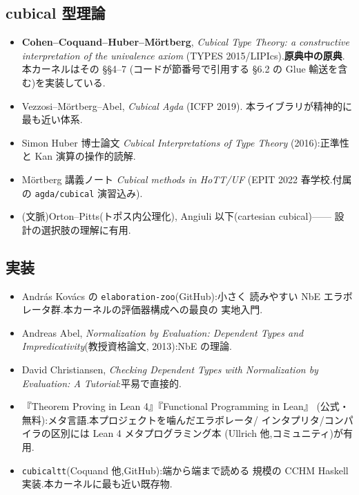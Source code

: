 \documentclass[11pt]{ltjsarticle}
\begin{document}
\subsection{cubical 型理論}
\begin{itemize}[leftmargin=1.5em]
\item \textbf{Cohen--Coquand--Huber--M\"ortberg}, \emph{Cubical Type
Theory: a constructive interpretation of the univalence axiom}
(TYPES 2015/LIPIcs).\textbf{原典中の原典}.本カーネルはその \S\S4--7
(コードが節番号で引用する \S6.2 の Glue 輸送を含む)を実装している.
\item Vezzosi--M\"ortberg--Abel, \emph{Cubical Agda} (ICFP 2019).
本ライブラリが精神的に最も近い体系.
\item Simon Huber 博士論文 \emph{Cubical Interpretations of Type Theory}
(2016):正準性と Kan 演算の操作的読解.
\item M\"ortberg 講義ノート \emph{Cubical methods in HoTT/UF}
(EPIT 2022 春学校.付属の \texttt{agda/cubical} 演習込み).
\item (文脈)Orton--Pitts(トポス内公理化),
Angiuli 以下(cartesian cubical)—— 設計の選択肢の理解に有用.
\end{itemize}

\subsection{実装}
\begin{itemize}[leftmargin=1.5em]
\item Andr\'as Kov\'acs の \texttt{elaboration-zoo}(GitHub):小さく
読みやすい NbE エラボレータ群.本カーネルの評価器構成への最良の
実地入門.
\item Andreas Abel, \emph{Normalization by Evaluation: Dependent Types
and Impredicativity}(教授資格論文, 2013):NbE の理論.
\item David Christiansen, \emph{Checking Dependent Types with
Normalization by Evaluation: A Tutorial}:平易で直接的.
\item 『Theorem Proving in Lean 4』『Functional Programming in Lean』
(公式・無料):メタ言語.本プロジェクトを噛んだエラボレータ/
インタプリタ/コンパイラの区別には Lean 4 メタプログラミング本
(Ullrich 他,コミュニティ)が有用.
\item \texttt{cubicaltt}(Coquand 他,GitHub):端から端まで読める
規模の CCHM Haskell 実装.本カーネルに最も近い既存物.
\end{itemize}
\end{document}
